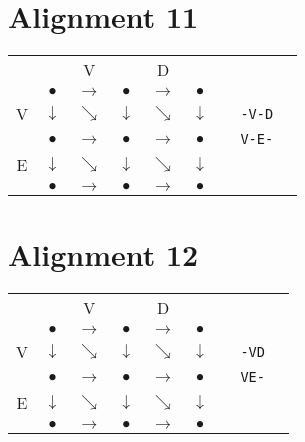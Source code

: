 \documentclass[landscape]{foils}
\begin{document}
\myNewSlide
\section*{Alignment 11}

{
\huge
\begin{center}
\begin{tabular}{cccccccp{1in}c}
   &              & V            &  & D & \\   
   & {\color{red} $\bullet$}      & {\color{black}$\rightarrow$}   & {\color{black} $\bullet$}        &   {\color{black}$\rightarrow$} & {\color{black}$\bullet$} \\
V  & {\color{red} $\downarrow$} & {\color{black}$\searrow$}    & {\color{black} $\downarrow$ } & {\color{black}$\searrow$}    & {\color{black} $\downarrow$ }  & & {\tt -V-D}\\
   & {\color{red} $\bullet$ }   & {\color{red}$\rightarrow$} &    {\color{red} $\bullet$ }   & {\color{black}$\rightarrow$} & {\color{black}  $\bullet$ } & & {\tt V-E-}\\   
E  & {\color{black} $\downarrow$} & {\color{black}$\searrow$}    & {\color{red} $\downarrow$ } & {\color{black}$\searrow$}    & {\color{black} $\downarrow$ }  \\
   & {\color{black} $\bullet$ }   & {\color{black}$\rightarrow$} & {\color{red} $\bullet$ }   & {\color{red}$\rightarrow$} & {\color{red}  $\bullet$ } \\   
\end{tabular}
\end{center}
}


\myNewSlide
\section*{Alignment 12}

{
\huge
\begin{center}
\begin{tabular}{cccccccp{1in}c}
   &              & V            &  & D & \\   
   & {\color{red} $\bullet$}      & {\color{black}$\rightarrow$}   & {\color{black} $\bullet$}        &   {\color{black}$\rightarrow$} & {\color{black}$\bullet$} \\
V  & {\color{red} $\downarrow$} & {\color{black}$\searrow$}    & {\color{black} $\downarrow$ } & {\color{black}$\searrow$}    & {\color{black} $\downarrow$ } & & {\tt -VD}  \\
   & {\color{red} $\bullet$ }   & {\color{black}$\rightarrow$} &    {\color{black} $\bullet$ }   & {\color{black}$\rightarrow$} & {\color{black}  $\bullet$ } & & {\tt VE-} \\   
E  & {\color{black} $\downarrow$} & {\color{red}$\searrow$}    & {\color{black} $\downarrow$ } & {\color{black}$\searrow$}    & {\color{black} $\downarrow$ }  \\
   & {\color{black} $\bullet$ }   & {\color{black}$\rightarrow$} & {\color{red} $\bullet$ }   & {\color{red}$\rightarrow$} & {\color{red}  $\bullet$ } \\   
\end{tabular}
\end{center}
}
\end{document}
